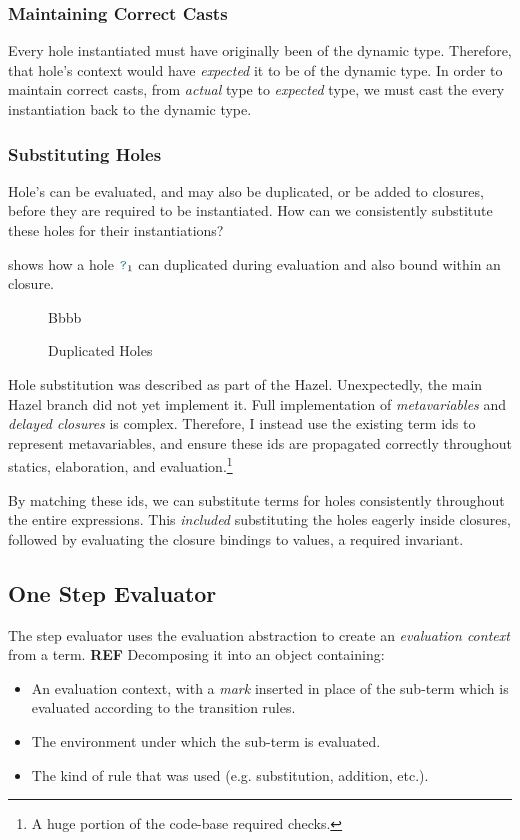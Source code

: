 \subsubsection{Maintaining Correct Casts}
Every hole instantiated must have originally been of the dynamic type. Therefore, that hole's context would have \textit{expected} it to be of the dynamic type. In order to maintain correct casts, from \textit{actual} type to \textit{expected} type, we must cast the every instantiation back to the dynamic type.

\subsubsection{Substituting Holes}\label{sec:HoleSubstitutionImplementation}
Hole's can be evaluated, and may also be duplicated, or be added to closures, before they are required to be instantiated. How can we consistently substitute these holes for their instantiations?

 shows how a hole ${\color{teal}\texttt{?}}_1$ can duplicated during evaluation and also bound within an closure.
\begin{figure}[h]
Bbbb
\caption{Duplicated Holes}
\label{fig:HoleDuplication}
\end{figure}

Hole substitution was described as part of the Hazel. Unexpectedly, the main Hazel branch did not yet implement it. Full implementation of \textit{metavariables} and \textit{delayed closures} is complex. Therefore, I instead use the existing term ids to represent metavariables, and ensure these ids are propagated correctly throughout statics, elaboration, and evaluation.\footnote{A huge portion of the code-base required checks.}

By matching these ids, we can substitute terms for holes consistently throughout the entire expressions. This \textit{included} substituting the holes eagerly inside closures, followed by evaluating the closure bindings to values, a required invariant. 

\subsection{One Step Evaluator}\label{sec:OneStepEvaluator}
The step evaluator uses the evaluation abstraction to create an \textit{evaluation context} from a term. \textbf{REF} Decomposing it into an object containing:
\begin{itemize}
\item An evaluation context, with a \textit{mark} inserted in place of the sub-term which is evaluated according to the transition rules.
\item The environment under which the sub-term is evaluated.
\item The kind of rule that was used (e.g. substitution, addition, etc.).
\end{itemize}

